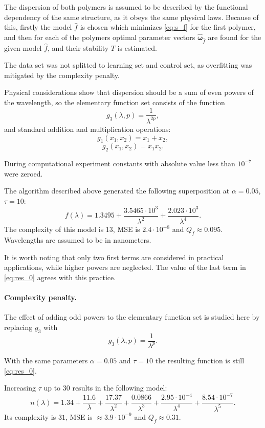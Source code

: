 \documentclass[11pt,a4paper]{article}
\theoremstyle{definition}
\begin{document}
The dispersion of both polymers is assumed to be described by the functional dependency
of the same structure, as it obeys the same physical laws. Because of this, firstly the
model $\hat{f}$ is chosen which minimizes \eqref{eq:s_f} for the first polymer, and then
for each of the polymers optimal parameter vectors $\hat{\boldsymbol{\omega}}_{\hat{f}}$
are found for the given model $\hat{f}$, and their stability $T$ is estimated.

The data set was not splitted to learning set and control set, as overfitting was
mitigated by the complexity penalty.

Physical considerations show \citep{Serova11_en} that dispersion should be a sum of even
powers of the wavelength, so the elementary function set consists of the function
\[
  g_3(\lambda, p) = \frac{1}{\lambda^{2p}},
\]
and standard addition and multiplication operations:
\[
  g_1(x_1, x_2) = x_1 + x_2,
\]
\[
  g_2(x_1, x_2) = x_1 x_2.
\]

During computational experiment constants with absolute value less than $10^{-7}$
were zeroed.

The algorithm described above generated the following superposition at $\alpha = 0.05$, $\tau = 10$:
\begin{equation}
  f(\lambda) = 1.3495 + \frac{3.5465 \cdot 10^3}{\lambda^2} + \frac{2.023 \cdot 10^3}{\lambda^4}.
  \label{eq:res_0}
\end{equation}
The complexity of this model is $13$, MSE is $2.4 \cdot 10^{-8}$ and $Q_f \approx 0.095$.
Wavelengths are assumed to be in nanometers.

It is worth noting that only two first terms are considered in practical applications, while
higher powers are neglected. The value of the last term in \eqref{eq:res_0}
agrees with this practice.

\paragraph{Complexity penalty.}

The effect of adding odd powers to the elementary function set is studied here by replacing
$g_3$ with 
\[
  g_3(\lambda, p) = \frac{1}{\lambda^p}.
\]

With the same parameters $\alpha = 0.05$ and $\tau = 10$ the resulting function is still
\eqref{eq:res_0}.

Increasing $\tau$ up to 30 results in the following model:
\begin{equation}
  n(\lambda) = 1.34 + \frac{11.6}{\lambda} + \frac{17.37}{\lambda^2} + \frac{0.0866}{\lambda^3} + \frac{2.95 \cdot 10^{-4}}{\lambda^4} + \frac{8.54 \cdot 10^{-7}}{\lambda^5}.
  \label{eq:res_incorrect}
\end{equation}
Its complexity is $31$, MSE is $\approx 3.9 \cdot 10^{-9}$ and $Q_f \approx 0.31$.
\end{document}
